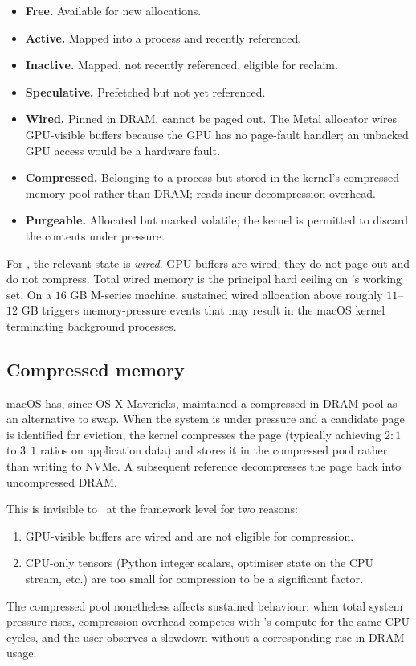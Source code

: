 \begin{itemize}
  \item \textbf{Free.} Available for new allocations.
  \item \textbf{Active.} Mapped into a process and recently
    referenced.
  \item \textbf{Inactive.} Mapped, not recently referenced, eligible
    for reclaim.
  \item \textbf{Speculative.} Prefetched but not yet referenced.
  \item \textbf{Wired.} Pinned in DRAM, cannot be paged out. The
    Metal allocator wires GPU-visible buffers because the GPU has no
    page-fault handler; an unbacked GPU access would be a hardware
    fault.
  \item \textbf{Compressed.} Belonging to a process but stored in the
    kernel's compressed memory pool rather than DRAM; reads incur
    decompression overhead.
  \item \textbf{Purgeable.} Allocated but marked volatile; the kernel
    is permitted to discard the contents under pressure.
\end{itemize}

For \Lucid, the relevant state is \emph{wired}. GPU buffers are
wired; they do not page out and do not compress. Total wired memory
is the principal hard ceiling on \Lucid's working set. On a
\(16\) GB M-series machine, sustained wired allocation above
roughly \(11\)--\(12\) GB triggers memory-pressure events that may
result in the macOS kernel terminating background processes.

\subsection{Compressed memory}
\label{ssec:unified_memory:compressed}

macOS has, since OS X Mavericks, maintained a compressed in-DRAM
pool as an alternative to swap. When the system is under pressure
and a candidate page is identified for eviction, the kernel
compresses the page (typically achieving \(2\!\!:\!\!1\) to
\(3\!\!:\!\!1\) ratios on application data) and stores it in the
compressed pool rather than writing to NVMe. A subsequent reference
decompresses the page back into uncompressed DRAM.

This is invisible to \Lucid\ at the framework level for two reasons:
\begin{enumerate}
  \item GPU-visible buffers are wired and are not eligible for
    compression.
  \item CPU-only tensors (Python integer scalars, optimiser state
    on the CPU stream, etc.) are too small for compression to be a
    significant factor.
\end{enumerate}
The compressed pool nonetheless affects sustained behaviour: when
total system pressure rises, compression overhead competes with
\Lucid's compute for the same CPU cycles, and the user observes a
slowdown without a corresponding rise in DRAM usage.

